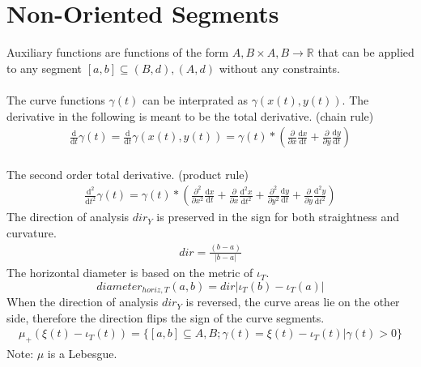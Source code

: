 \documentclass{report}
\begin{document}
\section{Non-Oriented Segments}
Auxiliary functions are functions of the form $A,B \times A,B \rightarrow \mathbb{R}$ that can be applied to any segment $[a,b] \subseteq (B,d),(A,d)$ without any constraints.\\\\
The curve functions $ \gamma (t)$ can be interprated as $\gamma(x(t),y(t))$. The derivative in the following is meant to be the total derivative. (chain rule)
\begin{align}
\frac{\mathrm{d}}{\mathrm{d} t} \gamma (t) = \frac{\mathrm{d}}{\mathrm{d} t} \gamma (x(t),y(t)) = \gamma(t)* (\frac{\partial}{\partial x}  \frac{\mathrm{d} x}{\mathrm{d}t} + \frac{\partial}{\partial y} \frac{\mathrm{d} y}{\mathrm{d}t})
\end{align}\\
The second order total derivative. (product rule)
\begin{align}
\frac{\mathrm{d}^2}{\mathrm{d}t^2}\gamma(t)= \gamma(t)* (\frac{\partial^2}{\partial x^2}\frac{\mathrm{d}x}{\mathrm{d}t} + \frac{\partial}{\partial x}\frac{\mathrm{d}^2x}{\mathrm{d}t^2} + \frac{\partial^2}{\partial y^2}\frac{\mathrm{d}y}{\mathrm{d}t} + \frac{\partial}{\partial y}\frac{\mathrm{d}^2y}{\mathrm{d}t^2})
\end{align}
The direction of analysis $dir_{Y}$ is preserved in the sign for both straightness and curvature.
\begin{align}
dir = \frac{(b-a)}{\lvert b-a \rvert}
\end{align}
The horizontal diameter is based on the metric of $\iota_{T}$.
\begin{equation}
diameter_{horiz,T}(a,b)= dir \lvert \iota_{T}(b) - \iota_{T}(a) \rvert
\end{equation}
When the direction of analysis $dir_{Y}$ is reversed, the curve areas lie on the other side, therefore the direction flips the sign of the curve segments.
\begin{align}
\mu_{+}(\xi(t) -\iota_{T}(t))=\{[a,b] \subseteq A,B; \gamma(t)=\xi(t) -\iota_{T}(t) \vert \gamma(t)>0\}
\end{align}
Note: $\mu$ is a Lebesgue.
\end{document}
